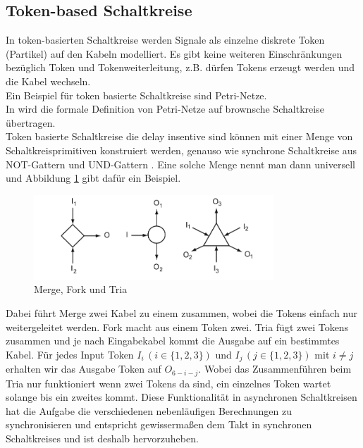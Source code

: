 \documentclass[11pt,a4paper]{article}
\begin{document}

\subsection{Token-based Schaltkreise}
In token-basierten Schaltkreise werden Signale als einzelne diskrete
Token (Partikel) auf den Kabeln modelliert.
%
Es gibt keine weiteren Einschränkungen bezüglich Token und Tokenweiterleitung,
z.B. dürfen Tokens erzeugt werden und die Kabel wechseln. \\
%
Ein Beispiel für token basierte Schaltkreise sind Petri-Netze. \\
%
In \cite{Peper_Fundamentals_2013} wird die formale Definition von Petri-Netze
auf brownsche Schaltkreise übertragen. \\
%
Token basierte Schaltkreise die delay insentive sind können mit 
einer Menge von Schaltkreisprimitiven konstruiert werden, genauso 
wie synchrone Schaltkreise aus NOT-Gattern und UND-Gattern
\cite{Peper_nonPolar_2018}.
%
Eine solche Menge nennt man dann universell und Abbildung \ref{fig:tokenBased}
gibt dafür ein Beispiel.


\begin{figure}[h]
       \centering
       \includegraphics[width=9cm]{bilder/tokenBased.png}
       \caption{Merge, Fork und Tria}
       \label{fig:tokenBased}
\end{figure}    


Dabei führt Merge zwei Kabel zu einem zusammen, wobei die Tokens einfach 
nur weitergeleitet werden.
% 
Fork macht aus einem Token zwei.
%
Tria fügt zwei Tokens zusammen und je nach Eingabekabel kommt
die Ausgabe auf ein bestimmtes Kabel.
%
Für jedes Input Token  $ I_{i} \, (i \in \{1, 2, 3\}) $ und $ I_{j} \, (j \in 
\{1, 2, 3\}) $ mit $ i \ne j $ erhalten wir das Ausgabe Token auf $O_{6-i-j}$.
%
Wobei das Zusammenführen beim Tria nur funktioniert wenn zwei Tokens da sind,
ein einzelnes Token wartet solange bis ein zweites kommt.
%
Diese Funktionalität in asynchronen Schaltkreisen hat die Aufgabe die 
verschiedenen nebenläufigen Berechnungen zu synchronisieren und entspricht
gewissermaßen dem Takt in synchronen Schaltkreises
und ist deshalb hervorzuheben.
%
\end{document}
